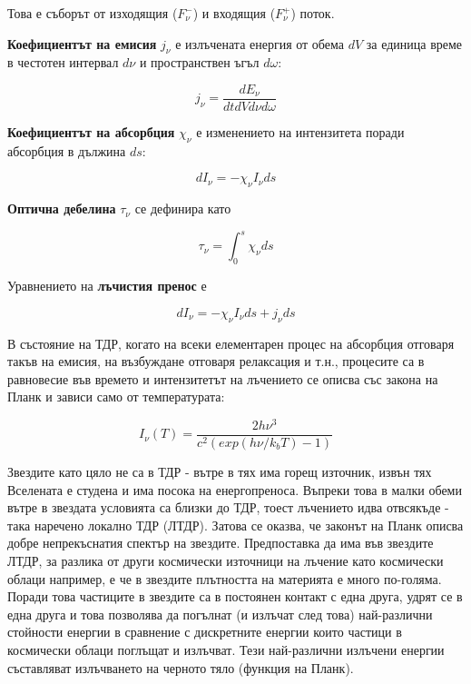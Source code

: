 \documentclass[a4paper,12pt]{article}
\begin{document}
 Това е съборът от изходящия ($F_{\nu}^{-}$)  и входящия ($F_{\nu}^{+}$) поток.

\textbf{Коефициентът на емисия} $j_{\nu}$ е излъчената енергия от обема $dV$ за единица време в честотен интервал $d\nu$ и пространствен ъгъл $d\omega$:

\begin{equation}
j_{\nu} = \frac{dE_{\nu}} {dt dV d\nu d\omega}
\end{equation}

\textbf{Коефициентът на абсорбция} $\chi_{\nu}$  е изменението на интензитета поради абсорбция в дължина $ds$:

\begin{equation}
dI_{\nu} = -\chi_{\nu} I_{\nu} ds
\end{equation}

\textbf{Оптична дебелина} $\tau_{\nu}$ се дефинира като

\begin{equation}
    \tau_{\nu} = \int_0^s \chi_{\nu} ds
\end{equation}

Уравнението на \textbf{лъчистия пренос} е

\begin{equation}
    dI_{\nu} = -\chi_{\nu} I_{\nu} ds + j_{\nu}ds
\end{equation}

В състояние на ТДР, когато на всеки елементарен процес на абсорбция отговаря такъв на емисия, на възбуждане отговаря релаксация и т.н., процесите са в равновесие във времето и интензитетът на лъчението се описва със закона на Планк и зависи само от температурата:

\begin{equation}
    I_{\nu}(T) = \frac{2h\nu^3} {c^2 (exp(h\nu / k_b T) -1)}
\end{equation}

 Звездите като цяло не са в ТДР - вътре в тях има горещ източник, извън тях Вселената е студена и има посока на енергопреноса. Въпреки това в малки обеми вътре в звездата условията са близки до ТДР, тоест лъчението идва отвсякъде - така наречено локално ТДР  (ЛТДР). Затова се оказва, че законът на Планк описва добре непрекъснатия спектър на звездите. Предпоставка да има във звездите ЛТДР, за разлика от други космически източници на лъчение като космически облаци например, е че в звездите плътността на материята е много по-голяма. Поради това частиците в звездите са в постоянен контакт с една друга, удрят се в една друга и това позволява да погълнат (и излъчат след това) най-различни стойности енергии в сравнение с дискретните енергии които частици в космически облаци поглъщат и излъчват. Тези най-различни излъчени енергии съставляват излъчването на черното тяло (функция на Планк).
 
\end{document}
